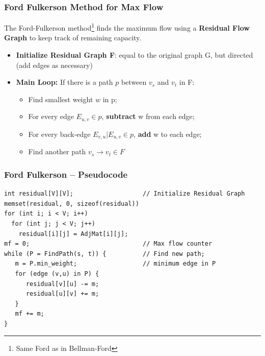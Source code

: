 \begin{frame}[fragile]
  \frametitle{Ford Fulkerson Method for Max Flow}

  \begin{block}{}
    The Ford-Fulkerson method\footnote{Same Ford as in Bellman-Ford} finds the maximum flow using a {\bf Residual Flow Graph} to keep track of remaining capacity.
  \end{block}

  \medskip

  \begin{itemize}
  \item {\bf Initialize Residual Graph F}: equal to the original graph G, but directed (add edges as necessary)\medskip
  \item {\bf Main Loop:} If there is a path $p$ between $v_s$ and $v_t$ in F:
  \begin{itemize}
    \item Find smallest weight $w$ in p;
    \item For every edge $E_{u,v} \in p$, {\bf subtract} w from each edge;
    \item For every back-edge $E_{v,u} | E_{u,v}\in p$, {\bf add} w to each edge;
    \item Find another path $v_s \to v_t \in F$
  \end{itemize}
  \end{itemize}
\end{frame}

\begin{frame}[fragile]
  \frametitle{Ford Fulkerson -- Pseudocode}
  \begin{exampleblock}{}
\begin{verbatim}
int residual[V][V];                   // Initialize Residual Graph
memset(residual, 0, sizeof(residual))
for (int i; i < V; i++)
  for (int j; j < V; j++)
    residual[i][j] = AdjMat[i][j];
mf = 0;                               // Max flow counter
while (P = FindPath(s, t)) {          // Find new path;
   m = P.min_weight;                  // minimum edge in P
   for (edge (v,u) in P) {
      residual[v][u] -= m;
      residual[u][v] += m;
   }
   mf += m;
}
\end{verbatim}
  \end{exampleblock}
\end{frame}

